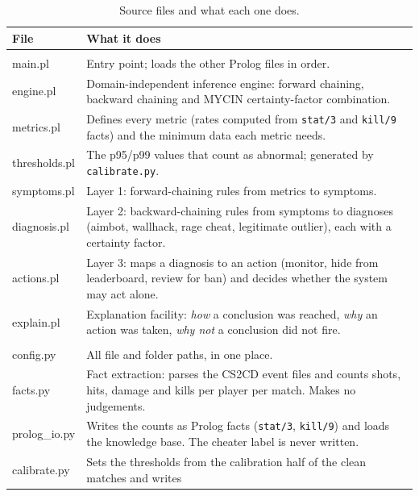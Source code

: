 \documentclass[11pt,a4paper]{article}
\newcommand{\code}[1]{\texttt{#1}}
\begin{document}
\begin{table}[H]
\centering
\small
\caption{Source files and what each one does.}
\label{tab:code}
\begin{tabularx}{\textwidth}{@{}>{\ttfamily}l X@{}}
\toprule
\normalfont\textbf{File} & \textbf{What it does} \\
\midrule
\multicolumn{2}{@{}l}{\textit{Knowledge base (\code{kb/}, SWI-Prolog)}} \\
main.pl        & Entry point; loads the other Prolog files in order. \\
engine.pl      & Domain-independent inference engine: forward chaining, backward chaining and
                 MYCIN certainty-factor combination. \\
metrics.pl     & Defines every metric (rates computed from \code{stat/3} and \code{kill/9} facts)
                 and the minimum data each metric needs. \\
thresholds.pl  & The p95/p99 values that count as abnormal; generated by \code{calibrate.py}. \\
symptoms.pl    & Layer 1: forward-chaining rules from metrics to symptoms. \\
diagnosis.pl   & Layer 2: backward-chaining rules from symptoms to diagnoses (aimbot, wallhack,
                 rage cheat, legitimate outlier), each with a certainty factor. \\
actions.pl     & Layer 3: maps a diagnosis to an action (monitor, hide from leaderboard, review
                 for ban) and decides whether the system may act alone. \\
explain.pl     & Explanation facility: \emph{how} a conclusion was reached, \emph{why} an action
                 was taken, \emph{why not} a conclusion did not fire. \\
\midrule
\multicolumn{2}{@{}l}{\textit{Python package (\code{src/cheatdetect/})}} \\
config.py         & All file and folder paths, in one place. \\
facts.py          & Fact extraction: parses the CS2CD event files and counts shots, hits, damage
                    and kills per player per match. Makes no judgements. \\
prolog\_io.py     & Writes the counts as Prolog facts (\code{stat/3}, \code{kill/9}) and loads the
                    knowledge base. The cheater label is never written. \\
calibrate.py      & Sets the thresholds from the calibration half of the clean matches and writes

\end{tabularx}
\end{table}
\end{document}
